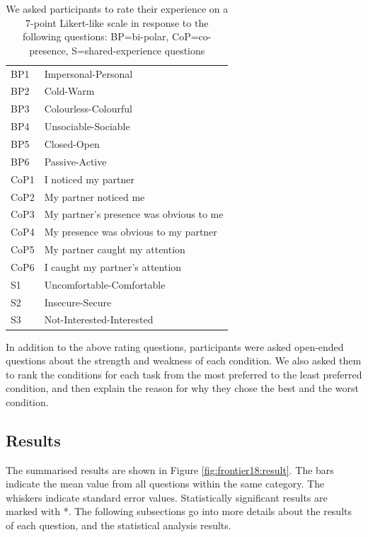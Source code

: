 \begin{table}
    \centering
    \caption{We asked participants to rate their experience on a 7-point Likert-like scale in response to the following questions: BP=bi-polar, CoP=co-presence, S=shared-experience questions}
    \begin{tabular}{ll}
BP1 &    Impersonal-Personal\\
BP2 &    Cold-Warm\\
BP3 &    Colourless-Colourful\\
BP4 &    Unsociable-Sociable\\
BP5 &    Closed-Open\\
BP6 &    Passive-Active\\
CoP1    &   I noticed my partner\\
CoP2    &   My partner noticed me\\
CoP3    &   My partner's presence was obvious to me\\
CoP4    &   My presence was obvious to my partner\\
CoP5    &   My partner caught my attention \\
CoP6    &   I caught my partner's attention\\
S1  & Uncomfortable-Comfortable\\
S2  & Insecure-Secure\\
S3  & Not-Interested-Interested\\
    \end{tabular}
    \label{tab:frontier:questions}
\end{table}

In addition to the above rating questions, participants were asked open-ended questions about the strength and weakness of each condition. We also asked them to rank the conditions for each task from the most preferred to the least preferred condition, and then explain the reason for why they chose the best and the worst condition. 

\subsection{Results}


The summarised results are shown in Figure \ref{fig:frontier18:result}. The bars indicate the mean value from all questions within the same category. The whiskers indicate standard error values. Statistically significant results are marked with *. The following subsections go into more details about the results of each question, and the statistical analysis results.

